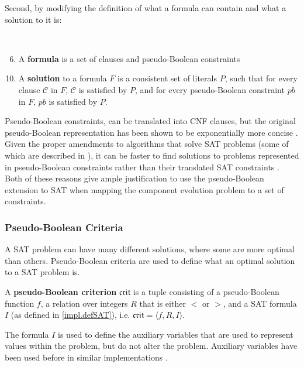 Second, by modifying the definition of what a formula can contain and what a solution to it is:
\begin{defs}
{\ }
\begin{enumerate}
\setcounter{enumi}{5}
    \item A \textbf{formula} is a set of clauses and pseudo-Boolean constraints
\end{enumerate}
\begin{enumerate}
\setcounter{enumi}{9}
    \item A \textbf{solution} to a formula $F$ is a consistent set of literals $P$, such that for every clause $\mathcal{C}$ in $F$, $\mathcal{C}$ is satisfied by $P$,
    and for every pseudo-Boolean constraint $pb$ in $F$, $pb$ is satisfied by $P$. 
\end{enumerate}
\end{defs}

Pseudo-Boolean constraints, can be translated into CNF clauses, but the original pseudo-Boolean representation has been shown to be exponentially more concise \citep{dixon2004automating}.
Given the proper amendments to algorithms that solve SAT problems (some of which are described in \citep{Sheini2006}), 
it can be faster to find solutions to problems represented in pseudo-Boolean constraints rather than their translated SAT constraints \citep{dixon2004automating}.
Both of these reasons give ample justification to use the pseudo-Boolean extension to SAT when mapping the component evolution problem to a set of constraints. 

\subsubsection{Pseudo-Boolean Criteria}
A SAT problem can have many different solutions, where some are more optimal than others.
Pseudo-Boolean criteria are used to define what an optimal solution to a SAT problem is. 

\begin{defs}
A \textbf{pseudo-Boolean criterion} $\mathfrak{crit}$ is a tuple consisting of a pseudo-Boolean function $f$,
a relation over integers $R$ that is either $<$ or $>$, and a SAT formula $I$ (as defined in \ref{impl.defSAT}),
i.e. $\mathfrak{crit} = \langle f, R , I \rangle$.
\end{defs}
The formula $I$ is used to define the auxiliary variables that are used to represent values within the problem, but do not alter the problem.
Auxiliary variables have been used before in similar implementations \citep{argelich2010solving}.

